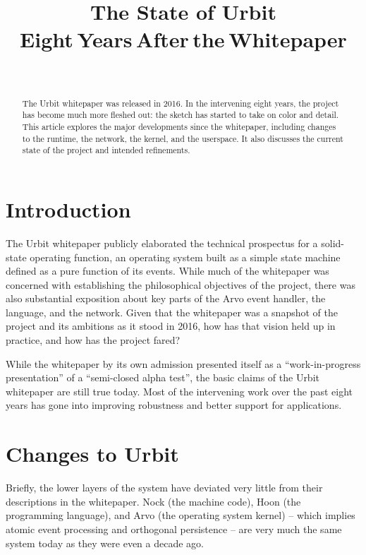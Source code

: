 \documentclass[twoside]{article}
\title{The State of Urbit\\Eight Years After the Whitepaper}
\author{\authorname~\authorpatp \\ \affiliation}
\date{}
\begin{document}
\maketitle
\thispagestyle{firststyle}

\begin{abstract}
The Urbit whitepaper was released in 2016.  In the intervening eight years, the project has become much more fleshed out:  the sketch has started to take on color and detail.  This article explores the major developments since the whitepaper, including changes to the runtime, the network, the kernel, and the userspace.  It also discusses the current state of the project and intended refinements.
\end{abstract}

\setcounter{page}{1}

\tableofcontents

\section{Introduction}

The Urbit whitepaper \citep{Whitepaper} publicly elaborated the technical prospectus for a solid-state operating function, an operating system built as a simple state machine defined as a pure function of its events.  While much of the whitepaper was concerned with establishing the philosophical objectives of the project, there was also substantial exposition about key parts of the Arvo event handler, the language, and the network.  Given that the whitepaper was a snapshot of the project and its ambitions as it stood in 2016, how has that vision held up in practice, and how has the project fared?

While the whitepaper by its own admission presented itself as a ``work-in-progress presentation'' of a ``semi-closed alpha test'', the basic claims of the Urbit whitepaper are still true today.  Most of the intervening work over the past eight years has gone into improving robustness and better support for applications.

\section{Changes to Urbit}

Briefly, the lower layers of the system have deviated very little from their descriptions in the whitepaper.  Nock (the machine code), Hoon (the programming language), and Arvo (the operating system kernel) – which implies atomic event processing and orthogonal persistence – are very much the same system today as they were even a decade ago.
\end{document}
